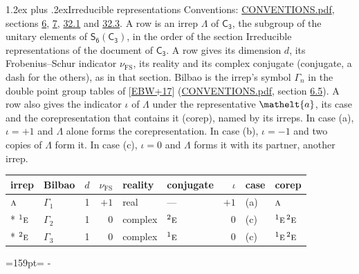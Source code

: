 \documentclass[10pt,a4paper]{article}
\makeatletter
\renewcommand\section{\@startsection{section}{1}{\z@}{-3ex plus -1ex minus -.2ex}%
  {1.2ex plus .2ex}{\normalfont\large\sffamily\bfseries\color{parttitle}}}
\newcommand{\needspace}[1]{\par\penalty-100\begingroup\dimen0=#1\relax\dimen2=\pagegoal
  \advance\dimen2-\pagetotal\ifdim\dimen0>\dimen2\relax\ifdim\dimen2>0pt\vfil\break\fi\fi
  \endgroup}
\numberwithin{equation}{section}
\newcommand{\eltfont}[1]{{\let\sigma\eltsigma\mathelt{#1}}}
\newcommand{\grp}[1]{\mathsf{#1}}
\newcommand{\irr}[1]{\text{\normalfont\scshape #1}}
\newcommand{\conjpair}[1]{{}^{#1}}
\newcommand{\elt}[1]{\eltfont{#1}}
\newcommand{\fsind}{\nu_{\mathrm{FS}}}
\makeatother
\begin{document}
\section{Irreducible representations}\label{s:irreps}
Conventions: \href{../../CONVENTIONS.pdf}{CONVENTIONS.pdf}, sections \href{../../../rotation/CONVENTIONS.pdf\#conv.6}{6}, \href{../../../rotation/CONVENTIONS.pdf\#conv.7}{7}, \href{../../CONVENTIONS.pdf\#conv.32.1}{32.1} and \href{../../CONVENTIONS.pdf\#conv.32.3}{32.3}.
\leavevmode\label{n:irrep.Delta}A row is an irrep $\Lambda$ of $\grp{C_{3}}$, the subgroup of the unitary elements of $\grp{S_{6}}(\grp{C_{3}})$, in the order of the section Irreducible representations of the document of \href{../../../rotation/data/pdf/C3.pdf}{$\grp{C_{3}}$}. \label{n:index.dimension}\label{n:index.frobenius}\label{n:head.irrep}\label{n:head.reality}\label{n:head.conjugate}A row gives its dimension $d$, its Frobenius--Schur indicator $\fsind$, its reality and its complex conjugate (conjugate, a dash for the others), as in that section. \label{n:head.bilbao}\label{n:irrep.alias.gamma}Bilbao is the irrep's symbol $\Gamma_n$ in the double point group tables of [\href{../../../REFERENCES.pdf\#ref.EBW+17}{EBW+17}] (\href{../../CONVENTIONS.pdf}{CONVENTIONS.pdf}, section \href{../../../rotation/CONVENTIONS.pdf\#conv.6.5}{6.5}). \label{n:head.case.corep}\label{n:head.corep}A row also gives the indicator $\iota$ of $\Lambda$ under the representative $\elt{a}$, its case and the corepresentation that contains it (corep), named by its irreps. In case (a), $\iota = +1$ and $\Lambda$ alone forms the corepresentation. In case (b), $\iota = -1$ and two copies of $\Lambda$ form it. In case (c), $\iota = 0$ and $\Lambda$ forms it with its partner, another irrep.
\setlength{\emergencystretch}{2em}\par\setlength{\emergencystretch}{0pt}
{\small\renewcommand{\arraystretch}{1.25}\setlength{\tabcolsep}{4pt}\begin{longtable}{@{}llrrllrll@{}}\toprule
irrep & Bilbao & $d$ & $\fsind$ & reality & conjugate & $\iota$ & case & corep\\\midrule\endhead
\bottomrule\endfoot\endlastfoot
$\irr{a}$ & $\Gamma_{1}$ & 1 & $+1$ & real & --- & $+1$ & (a) & $\irr{a}$\\*
$\conjpair{1}\irr{e}$ & $\Gamma_{2}$ & 1 & $0$ & complex & $\conjpair{2}\irr{e}$ & $0$ & (c) & $\conjpair{1}\irr{e}\,\conjpair{2}\irr{e}$\\*
$\conjpair{2}\irr{e}$ & $\Gamma_{3}$ & 1 & $0$ & complex & $\conjpair{1}\irr{e}$ & $0$ & (c) & $\conjpair{1}\irr{e}\,\conjpair{2}\irr{e}$\\
\bottomrule\end{longtable}}
\needspace{159pt}
\end{document}
